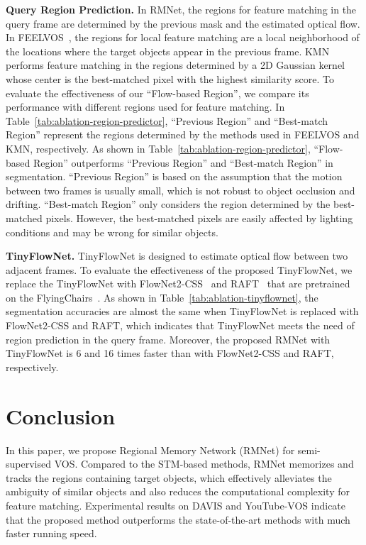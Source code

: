 \documentclass[final]{cvpr}
\begin{document}
\noindent \textbf{Query Region Prediction.}
In RMNet, the regions for feature matching in the query frame are determined by the previous mask and the estimated optical flow.
In FEELVOS~\cite{DBLP:conf/cvpr/VoigtlaenderCSA19}, the regions for local feature matching are a local neighborhood of the locations where the target objects appear in the previous frame.
KMN~\cite{DBLP:conf/eccv/SeongHK20} performs feature matching in the regions determined by a 2D Gaussian kernel whose center is the best-matched pixel with the highest similarity score.
To evaluate the effectiveness of our ``Flow-based Region'', we compare its performance with different regions used for feature matching.
In Table~\ref{tab:ablation-region-predictor}, ``Previous Region'' and ``Best-match Region'' represent the regions determined by the methods used in FEELVOS and KMN, respectively.
As shown in Table~\ref{tab:ablation-region-predictor}, ``Flow-based Region'' outperforms ``Previous Region'' and ``Best-match Region'' in segmentation.
``Previous Region'' is based on the assumption that the motion
between two frames is usually small, which is not robust to object occlusion and drifting.
``Best-match Region'' only considers the region determined by the best-matched pixels.
However, the best-matched pixels are easily affected by lighting conditions and may be wrong for similar objects.

\noindent \textbf{TinyFlowNet.}
TinyFlowNet is designed to estimate  optical flow between two adjacent frames.
To evaluate the effectiveness of the proposed TinyFlowNet, we replace the TinyFlowNet with FlowNet2-CSS~\cite{DBLP:conf/cvpr/IlgMSKDB17} and RAFT~\cite{DBLP:conf/eccv/TeedD20} that are pretrained on the FlyingChairs~\cite{DBLP:conf/iccv/DosovitskiyFIHH15}.
As shown in Table~\ref{tab:ablation-tinyflownet}, the segmentation accuracies are almost the same when TinyFlowNet is replaced with FlowNet2-CSS and RAFT, which indicates that TinyFlowNet meets the need of region prediction in the query frame.
Moreover, the proposed RMNet with TinyFlowNet is 6 and 16 times faster than with FlowNet2-CSS and RAFT, respectively.

\section{Conclusion}

In this paper, we propose Regional Memory Network (RMNet) for semi-supervised VOS.
Compared to the STM-based methods, RMNet memorizes and tracks the regions containing target objects, which effectively alleviates the ambiguity of similar objects and also reduces the computational complexity for feature matching.
Experimental results on DAVIS and YouTube-VOS indicate that the proposed method outperforms the state-of-the-art methods with much faster running speed.
\end{document}
